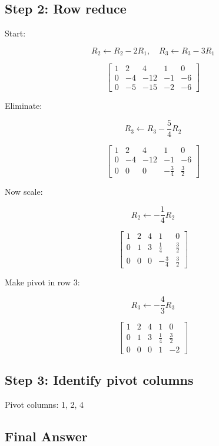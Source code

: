 \documentclass[11pt]{article}
\begin{document}
\subsection*{Step 2: Row reduce}

Start:

\[
R_2 \leftarrow R_2 - 2R_1,\quad
R_3 \leftarrow R_3 - 3R_1
\]

\[
\begin{bmatrix}
1 & 2 & 4 & 1 & 0 \\
0 & -4 & -12 & -1 & -6 \\
0 & -5 & -15 & -2 & -6
\end{bmatrix}
\]

Eliminate:

\[
R_3 \leftarrow R_3 - \frac{5}{4}R_2
\]

\[
\begin{bmatrix}
1 & 2 & 4 & 1 & 0 \\
0 & -4 & -12 & -1 & -6 \\
0 & 0 & 0 & -\frac{3}{4} & \frac{3}{2}
\end{bmatrix}
\]

Now scale:

\[
R_2 \leftarrow -\frac{1}{4}R_2
\]

\[
\begin{bmatrix}
1 & 2 & 4 & 1 & 0 \\
0 & 1 & 3 & \frac{1}{4} & \frac{3}{2} \\
0 & 0 & 0 & -\frac{3}{4} & \frac{3}{2}
\end{bmatrix}
\]

Make pivot in row 3:

\[
R_3 \leftarrow -\frac{4}{3}R_3
\]

\[
\begin{bmatrix}
1 & 2 & 4 & 1 & 0 \\
0 & 1 & 3 & \frac{1}{4} & \frac{3}{2} \\
0 & 0 & 0 & 1 & -2
\end{bmatrix}
\]

\subsection*{Step 3: Identify pivot columns}

Pivot columns: 1, 2, 4

\subsection*{Final Answer}
\end{document}

